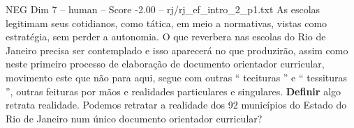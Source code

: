\begin{textsample}{NEG Dim 7 – human – Score -2.00 – rj/rj\_ef\_intro\_2\_p1.txt}  \label{ex:f7_neg_013}
As escolas legitimam seus cotidianos, como tática, em meio a normativas, vistas como estratégia, sem perder a autonomia.
O que reverbera nas escolas do Rio de Janeiro precisa ser contemplado e isso aparecerá no que produzirão, assim como neste primeiro processo de elaboração de documento orientador curricular, movimento este que não para aqui, segue com outras “ tecituras ” e “ tessituras ”, outras feituras por mãos e realidades particulares e singulares. \textbf{Definir} algo retrata realidade.
Podemos retratar a realidade dos 92 municípios do Estado do Rio de Janeiro num único documento orientador curricular?

\end{textsample}
